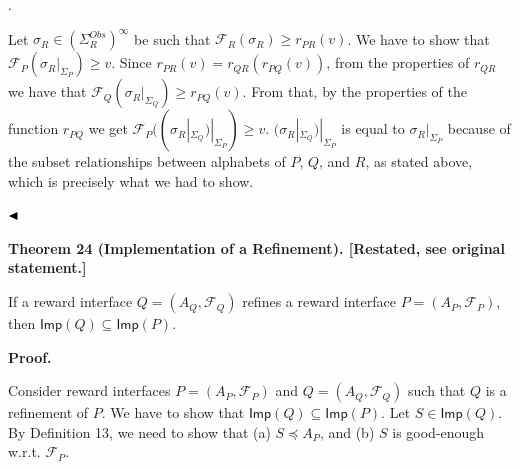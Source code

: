  
 
\par{}. 
 
Let $\sigma_{R}\in(\Sigma_{R}^{Obs})^{\infty}$ be such that $\mathcal{F}_{R}(\sigma_{R})\geq r_{PR}(v)$. We have to show that $\mathcal{F}_{P}(\sigma_{R}|_{\Sigma_{P}})\geq v$. Since $r_{PR}(v)=r_{QR}(r_{PQ}(v))$, from the properties of $r_{QR}$ we have that $\mathcal{F}_{Q}(\sigma_{R}|_{\Sigma_{Q}})\geq r_{PQ}(v)$. From that, by the properties of the function $r_{PQ}$ we get $\mathcal{F}_{P}((\sigma_{R}|_{\Sigma_{Q}})|_{\Sigma_{P}})\geq v$. $(\sigma_{R}|_{\Sigma_{Q}})|_{\Sigma_{P}}$ is equal to $\sigma_{R}|_{\Sigma_{P}}$ because of the subset relationships between alphabets of $P$, $Q$, and $R$, as stated above, which is precisely what we had to show.\par
 
 
  
$\hfill\blacktriangleleft$\par
 
 
 
 
\par\medskip\noindent\textbf{Theorem 24 (Implementation of a Refinement). [Restated, see original statement.]}\par
 
 
If a reward interface $Q=(A_{Q},\mathcal{F}_{Q})$ refines a reward interface $P=(A_{P},\mathcal{F}_{P})$, then $\mathsf{Imp}(Q)\subseteq\mathsf{Imp}(P)$.\par
 
 
 
 
 
 
\par\medskip\noindent\textbf{Proof.}\par
 
 
Consider reward interfaces $P=(A_{P},\mathcal{F}_{P})$ and $Q=(A_{Q},\mathcal{F}_{Q})$ such that $Q$ is a refinement of $P$. We have to show that $\mathsf{Imp}(Q)\subseteq\mathsf{Imp}(P)$. Let $S\in\mathsf{Imp}(Q)$. By Definition 13, we need to show that (a) $S\preceq A_{P}$, and (b) $S$ is good-enough w.r.t. $\mathcal{F}_{P}$.\par
 
